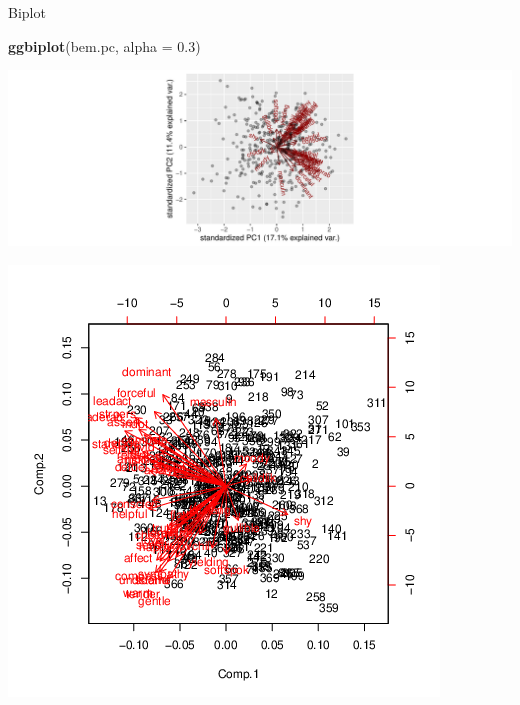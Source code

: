 \documentclass[
  ignorenonframetext,
]{beamer}
\newenvironment{Shaded}{\begin{snugshade}}{\end{snugshade}}
\newcommand{\DataTypeTok}[1]{\textcolor[rgb]{0.13,0.29,0.53}{#1}}
\newcommand{\FloatTok}[1]{\textcolor[rgb]{0.00,0.00,0.81}{#1}}
\newcommand{\KeywordTok}[1]{\textcolor[rgb]{0.13,0.29,0.53}{\textbf{#1}}}
\newcommand{\NormalTok}[1]{#1}
\begin{document}
\begin{frame}[fragile]{Biplot}
\protect\hypertarget{biplot-4}{}

\begin{Shaded}
\begin{Highlighting}[]
\KeywordTok{ggbiplot}\NormalTok{(bem.pc, }\DataTypeTok{alpha =} \FloatTok{0.3}\NormalTok{)}
\end{Highlighting}
\end{Shaded}

\includegraphics{slides_d29_files/figure-beamer/bem-biplot-1.pdf}

\includegraphics{bFactor-bem-biplot.png}

\end{frame}
\end{document}
